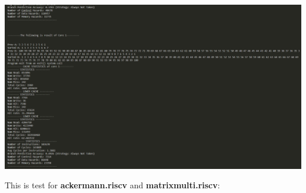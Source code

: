 \mathbb{R} \documentclass{article}
\begin{document}
\begin{center}
  \includegraphics[scale = 0.25]{3.png}
\end{center}
This is test for \textbf{ackermann.riscv} and \textbf{matrixmulti.riscv}:\\
\end{document}

